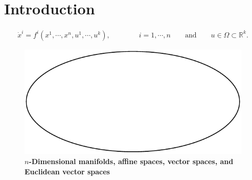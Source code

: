 \section{Introduction}



\begin{align}
	\dot x^i = f^i(x^1, \cdots, x^n, u^1, \cdots, u^k),
		\qquad\qquad i = 1, \cdots, n \qquad \text{and}\qquad u \in \Omega \subset \mathbb{R}^k.
\end{align}


\begin{figure}[h]
\centering
\includegraphics[width=12 cm]{Figures/Stellar}
\caption{\bf \small $n$-Dimensional manifolds, affine spaces, vector spaces, and Euclidean vector spaces}
\label{fig:Stellar}
\end{figure}

